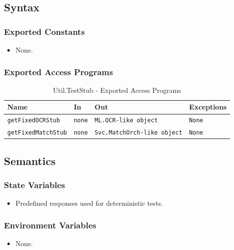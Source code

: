 \documentclass[12pt, titlepage]{article}
\begin{document}
\subsection{Syntax}

\subsubsection{Exported Constants}
\begin{itemize}
    \item None.
\end{itemize}

\subsubsection{Exported Access Programs}

\begin{table}[H]
\centering
\small
\caption{Util.TestStub - Exported Access Programs}
\begin{tabular}{p{3.8cm} p{2.5cm} p{4.2cm} p{3.5cm}}
\toprule
\textbf{Name} & \textbf{In} & \textbf{Out} & \textbf{Exceptions} \\
\midrule
\texttt{getFixedOCRStub} & \texttt{none} & \texttt{ML.OCR-like object} & \texttt{None} \\
\texttt{getFixedMatchStub} & \texttt{none} & \texttt{Svc.MatchOrch-like object} & \texttt{None} \\
\bottomrule
\end{tabular}
\end{table}

\subsection{Semantics}

\subsubsection{State Variables}
\begin{itemize}
    \item Predefined responses used for deterministic tests.
\end{itemize}

\subsubsection{Environment Variables}
\begin{itemize}
    \item None.
\end{itemize}
\end{document}
